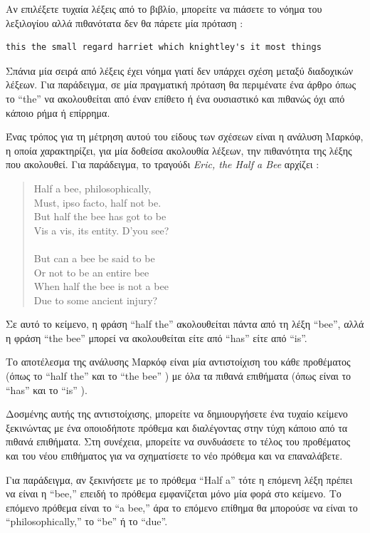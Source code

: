 \documentclass[10pt]{book}
\begin{document}
Αν επιλέξετε τυχαία λέξεις από το βιβλίο, μπορείτε να πιάσετε το νόημα του λεξιλογίου αλλά πιθανότατα δεν θα πάρετε μία πρόταση :

\begin{verbatim}
this the small regard harriet which knightley's it most things
\end{verbatim}
%
 Σπάνια μία σειρά από λέξεις έχει νόημα γιατί δεν υπάρχει σχέση μεταξύ διαδοχικών λέξεων. Για παράδειγμα, σε μία πραγματική πρόταση θα περιμένατε ένα άρθρο όπως το  ``the''  να ακολουθείται από έναν επίθετο ή ένα ουσιαστικό και πιθανώς όχι από κάποιο ρήμα ή επίρρημα.

Ένας τρόπος για τη μέτρηση αυτού του είδους των σχέσεων είναι η ανάλυση Μαρκόφ, η οποία χαρακτηρίζει, για μία δοθείσα ακολουθία λέξεων, την πιθανότητα της λέξης που ακολουθεί. Για παράδειγμα, το τραγούδι  {\em Eric, the Half a Bee}  αρχίζει :

\begin{quote}
Half a bee, philosophically, \\
Must, ipso facto, half not be. \\
But half the bee has got to be \\
Vis a vis, its entity. D'you see? \\
\\
But can a bee be said to be \\
Or not to be an entire bee \\
When half the bee is not a bee \\
Due to some ancient injury? \\
\end{quote}
%
 Σε αυτό το κείμενο, η φράση  ``half the''  ακολουθείται πάντα από τη λέξη  ``bee'',  αλλά η φράση  ``the bee''  μπορεί να ακολουθείται είτε από  ``has''  είτε από  ``is''.

 Το αποτέλεσμα της ανάλυσης Μαρκόφ είναι μία αντιστοίχιση του κάθε προθέματος (όπως το  ``half the''  και το  ``the bee'' ) με όλα τα πιθανά επιθήματα (όπως είναι το  ``has''  και το  ``is'' ).

Δοσμένης αυτής της αντιστοίχισης, μπορείτε να δημιουργήσετε ένα τυχαίο κείμενο ξεκινώντας με ένα οποιοδήποτε πρόθεμα και διαλέγοντας στην τύχη κάποιο από τα πιθανά επιθήματα. Στη συνέχεια, μπορείτε να συνδυάσετε το τέλος του προθέματος και του νέου επιθήματος για να σχηματίσετε το νέο πρόθεμα και να επαναλάβετε.

Για παράδειγμα, αν ξεκινήσετε με το πρόθεμα  ``Half a''  τότε η επόμενη λέξη πρέπει να είναι η  ``bee,''  επειδή 
το πρόθεμα εμφανίζεται μόνο μία φορά στο κείμενο. Το επόμενο πρόθεμα είναι το  ``a bee,''  άρα το επόμενο επίθημα θα μπορούσε να είναι το  ``philosophically,''  το  ``be''  ή το  ``due''.
\end{document}
